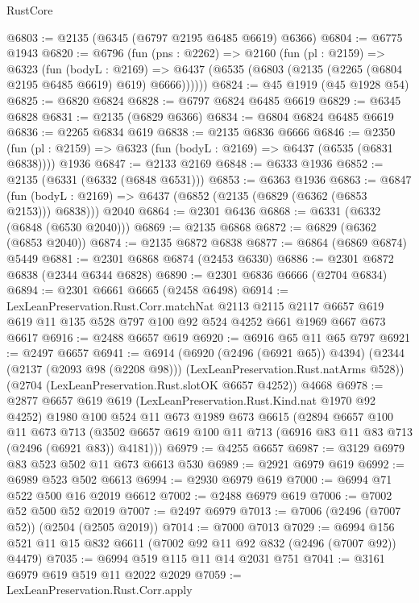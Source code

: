 \begin{lexlean}{RustCore}
\begin{coremodule}
@6803 := @2135 (@6345 (@6797 @2195 @6485 @6619) @6366)
@6804 := @6775 @1943
@6820 := @6796
    (fun (pns : @2262) =>
    @2160
      (fun (pl : @2159) =>
      @6323
        (fun (bodyL : @2169) =>
        @6437 (@6535 (@6803 (@2135 (@2265 (@6804 @2195 @6485 @6619) @619) @6666))))))
@6824 := @45 @1919 (@45 @1928 @54)
@6825 := @6820 @6824
@6828 := @6797 @6824 @6485 @6619
@6829 := @6345 @6828
@6831 := @2135 (@6829 @6366)
@6834 := @6804 @6824 @6485 @6619
@6836 := @2265 @6834 @619
@6838 := @2135 @6836 @6666
@6846 := @2350
    (fun (pl : @2159) => @6323 (fun (bodyL : @2169) => @6437 (@6535 (@6831 @6838))))
    @1936
@6847 := @2133 @2169
@6848 := @6333 @1936
@6852 := @2135 (@6331 (@6332 (@6848 @6531)))
@6853 := @6363 @1936
@6863 := @6847
    (fun (bodyL : @2169) => @6437 (@6852 (@2135 (@6829 (@6362 (@6853 @2153))) @6838)))
    @2040
@6864 := @2301 @6436
@6868 := @6331 (@6332 (@6848 (@6530 @2040)))
@6869 := @2135 @6868
@6872 := @6829 (@6362 (@6853 @2040))
@6874 := @2135 @6872 @6838
@6877 := @6864 (@6869 @6874) @5449
@6881 := @2301 @6868 @6874 (@2453 @6330)
@6886 := @2301 @6872 @6838 (@2344 @6344 @6828)
@6890 := @2301 @6836 @6666 (@2704 @6834)
@6894 := @2301 @6661 @6665 (@2458 @6498)
@6914 := LexLeanPreservation.Rust.Corr.matchNat
    @2113
    @2115
    @2117
    @6657
    @619
    @619
    @11
    @135
    @528
    @797
    @100
    @92
    @524
    @4252
    @661
    @1969
    @667
    @673
    @6617
@6916 := @2488 @6657 @619
@6920 := @6916 @65 @11 @65 @797
@6921 := @2497 @6657
@6941 := @6914
    (@6920 (@2496 (@6921 @65)) @4394)
    (@2344 (@2137 (@2093 @98 (@2208 @98))) (LexLeanPreservation.Rust.natArms @528))
    (@2704 (LexLeanPreservation.Rust.slotOK @6657 @4252))
    @4668
@6978 := @2877
    @6657
    @619
    @619
    (LexLeanPreservation.Rust.Kind.nat @1970 @92 @4252)
    @1980
    @100
    @524
    @11
    @673
    @1989
    @673
    @6615
    (@2894
      @6657
      @100
      @11
      @673
      @713
      (@3502 @6657 @619 @100 @11 @713 (@6916 @83 @11 @83 @713 (@2496 (@6921 @83)) @4181)))
@6979 := @4255 @6657
@6987 := @3129 @6979 @83 @523 @502 @11 @673 @6613 @530
@6989 := @2921 @6979 @619
@6992 := @6989 @523 @502 @6613
@6994 := @2930 @6979 @619
@7000 := @6994 @71 @522 @500 @16 @2019 @6612
@7002 := @2488 @6979 @619
@7006 := @7002 @52 @500 @52 @2019
@7007 := @2497 @6979
@7013 := @7006 (@2496 (@7007 @52)) (@2504 (@2505 @2019))
@7014 := @7000 @7013
@7029 := @6994 @156 @521 @11 @15 @832 @6611 (@7002 @92 @11 @92 @832 (@2496 (@7007 @92)) @4479)
@7035 := @6994 @519 @115 @11 @14 @2031 @751
@7041 := @3161 @6979 @619 @519 @11 @2022 @2029
@7059 := LexLeanPreservation.Rust.Corr.apply

\end{coremodule}
\end{lexlean}
